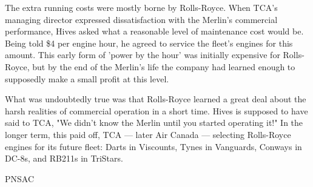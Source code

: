 The extra running costs were mostly borne by Rolls-Royce. When TCA's managing
director expressed dissatisfaction with the Merlin's commercial performance,
Hives asked what a reasonable level of maintenance cost would be. Being told
\$4 per engine hour, he agreed to service the fleet's engines for this amount.
This early form of 'power by the hour' was initially expensive for Rolls-Royce,
but by the end of the Merlin's life the company had learned enough to
supposedly make a small profit at this level.

What was undoubtedly true was that Rolls-Royce learned a great deal about the
harsh realities of commercial operation in a short time. Hives is supposed to
have said to TCA, "We didn't know the Merlin until you started operating it!"
In the longer term, this paid off, TCA — later Air Canada — selecting
Rolls-Royce engines for its future fleet: Darts in Viscounts, Tynes in
Vanguards, Conways in DC-8s, and RB211s in TriStars.

\begin{footnotesize}
  \raggedleft PNSAC\\
\end{footnotesize}



